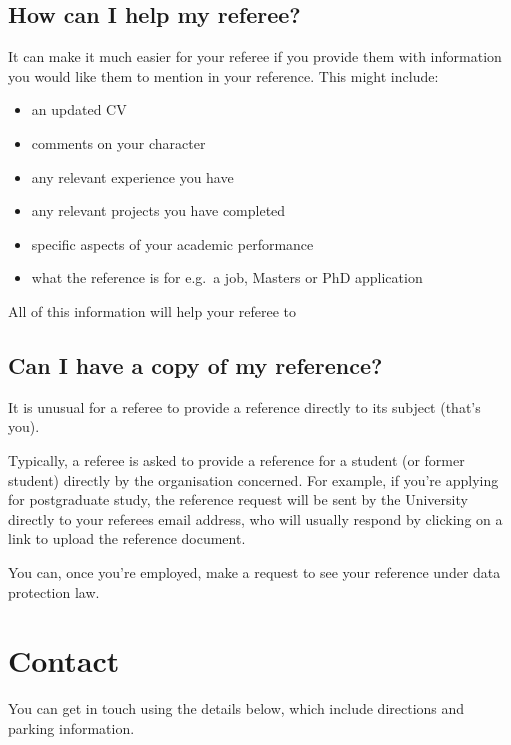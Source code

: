 \documentclass[
  12pt,
]{book}
\providecommand{\tightlist}{%
  \setlength{\itemsep}{0pt}\setlength{\parskip}{0pt}}
\begin{document}
\hypertarget{how-can-i-help-my-referee}{%
\section{How can I help my referee?}\label{how-can-i-help-my-referee}}

It can make it much easier for your referee if you provide them with information you would like them to mention in your reference. This might include:

\begin{itemize}
\tightlist
\item
  an updated CV\\
\item
  comments on your character
\item
  any relevant experience you have
\item
  any relevant projects you have completed
\item
  specific aspects of your academic performance
\item
  what the reference is for e.g.~a job, Masters or PhD application
\end{itemize}

All of this information will help your referee to

\hypertarget{can-i-have-a-copy-of-my-reference}{%
\section{Can I have a copy of my reference?}\label{can-i-have-a-copy-of-my-reference}}

It is unusual for a referee to provide a reference directly to its subject (that's you).

Typically, a referee is asked to provide a reference for a student (or former student) directly by the organisation concerned. For example, if you're applying for postgraduate study, the reference request will be sent by the University directly to your referees email address, who will usually respond by clicking on a link to upload the reference document.

You can, once you're employed, make a request to see your reference under data protection law.

\hypertarget{contact}{%
\chapter{Contact}\label{contact}}

You can get in touch using the details below, which include directions and parking information.
\end{document}

